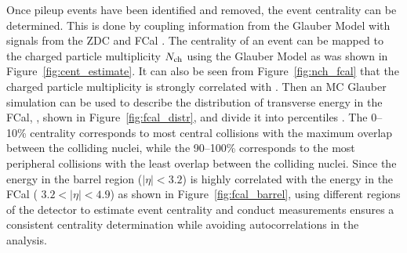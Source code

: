 Once pileup events have been identified and removed, the event centrality can be determined.
This is done by coupling information from the Glauber Model with signals from the ZDC and FCal \cite{ATLAS:2016tor, Aaboud:2018ves}.
The centrality of an event can be mapped to the charged particle multiplicity $N_{\rm ch}$ using the Glauber Model as was shown in Figure~\ref{fig:cent_estimate}.
It can also be seen from Figure~\ref{fig:nch_fcal} that the charged particle multiplicity is strongly correlated with \ETfcal.
Then an MC Glauber simulation can be used to describe the distribution of transverse energy in the FCal, \ETfcal, shown in Figure~\ref{fig:fcal_distr}, and divide it into percentiles \cite{ATLAS:2011ah}.
The 0--10\% centrality corresponds to most central collisions with the maximum overlap between the colliding nuclei, while the 90--100\% corresponds to the most peripheral collisions with the least overlap between the colliding nuclei.
Since the energy in the barrel region ($|\eta| < 3.2$) is highly correlated with the energy in the FCal ( $3.2 < |\eta| < 4.9$) as shown in Figure~\ref{fig:fcal_barrel}, using different regions of the detector to estimate event centrality and conduct measurements ensures a consistent centrality determination while avoiding autocorrelations in the analysis.



